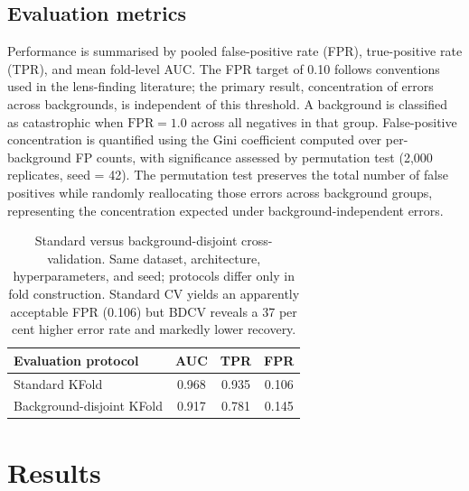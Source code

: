 \documentclass[fleqn,usenatbib]{mnras}
\begin{document}
\subsection{Evaluation metrics}
\label{sec:metrics}

Performance is summarised by pooled false-positive rate (FPR),
true-positive rate (TPR), and mean fold-level AUC. The FPR target of
0.10 follows conventions used in the lens-finding literature; the
primary result, concentration of errors across backgrounds, is
independent of this threshold. A background is
classified as catastrophic when $\mathrm{FPR} = 1.0$ across all
negatives in that group. False-positive concentration is quantified using
the Gini coefficient computed over per-background FP counts, with
significance assessed by permutation test (2,000 replicates, seed = 42).
The permutation test preserves the total number of false positives while
randomly reallocating those errors across background groups, representing
the concentration expected under background-independent errors.

\begin{table}
\centering
\caption{Standard versus background-disjoint cross-validation. Same
dataset, architecture, hyperparameters, and seed; protocols differ only
in fold construction. Standard CV yields an apparently acceptable FPR
(0.106) but BDCV reveals a 37 per cent higher error rate and markedly
lower recovery.}
\label{tab:cv_comparison}
\begin{tabular}{lccc}
\hline
Evaluation protocol & AUC & TPR & FPR \\
\hline
Standard KFold       & 0.968 & 0.935 & 0.106 \\
Background-disjoint KFold & 0.917 & 0.781 & 0.145 \\
\hline
\end{tabular}
\end{table}

\section{Results}
\label{sec:results}
\end{document}
